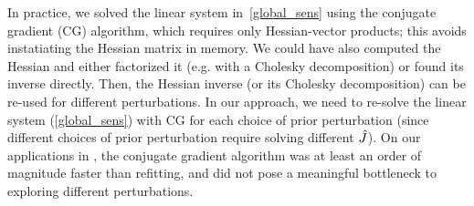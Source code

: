 In practice, we solved the linear system in~\eqref{global_sens} using
the conjugate gradient (CG) algorithm, which requires only Hessian-vector products;
this avoids instatiating the Hessian matrix in memory.
We could have also computed the Hessian and
either factorized it (e.g. with a Cholesky decomposition) or found its inverse directly.
Then, the Hessian inverse (or its Cholesky decomposition) can
be re-used for different perturbations.
In our approach, we need to re-solve the linear system (\eqref{global_sens}) with
CG for each choice of prior perturbation (since different choices of prior perturbation
require solving different $\hat J$).
On our applications in , the conjugate gradient algorithm was at least
an order of magnitude faster than refitting, and did not pose a meaningful bottleneck
to exploring different perturbations.
